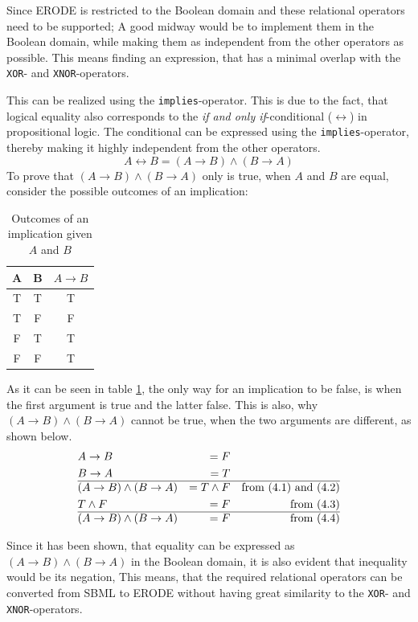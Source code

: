 Since ERODE is restricted to the Boolean domain and these relational operators need to be supported; A good midway would be to implement them in the Boolean domain, while making them as independent from the other operators as possible. This means finding an expression, that has a minimal overlap with the \texttt{XOR}- and \texttt{XNOR}-operators.

This can be realized using the \texttt{implies}-operator. This is due to the fact, that logical equality also corresponds to the \emph{if and only if}-conditional ($\leftrightarrow$) in propositional logic. The conditional can be expressed using the \texttt{implies}-operator, thereby making it highly independent from the other operators.
\[
    A \leftrightarrow B = (A \rightarrow B) \land (B \rightarrow A)
\]
To prove that $(A \rightarrow B) \land (B \rightarrow A)$ only is true, when $A$ and $B$ are equal, consider the possible outcomes of an implication:
\begin{table}[H]
    \centering
    \begin{tabular}{|c|c|c|}
        \hline
         A & B & $A \rightarrow B$  \\
         \hline
         T & T & T \\
         T & F & F \\
         F & T & T \\
         F & F & T \\
         \hline
    \end{tabular}
    \caption{Outcomes of an implication given $A$ and $B$}
    \label{tab:implies}
\end{table}
As it can be seen in table \ref{tab:implies}, the only way for an implication to be false, is when the first argument is true and the latter false. This is also, why $(A \rightarrow B) \land (B \rightarrow A)$ cannot be true, when the two arguments are different, as shown below.
\begin{align}
    &A \rightarrow B &= F \\
    &B \rightarrow A &= T \\
    \hline
    &(A \rightarrow B) \land (B \rightarrow A) &= T \land F & &\text{from (4.1) and (4.2)} \\
    &T \land F &= F& &\text{from (4.3)}\\
    \hline
    &(A \rightarrow B) \land (B \rightarrow A) &= F& &\text{from (4.4)}
\end{align}

Since it has been shown, that equality can be expressed as $(A \rightarrow B) \land (B \rightarrow A)$ in the Boolean domain, it is also evident that inequality would be its negation, This means, that the required relational operators can be converted from SBML to ERODE without having great similarity to the \texttt{XOR}- and \texttt{XNOR}-operators.

